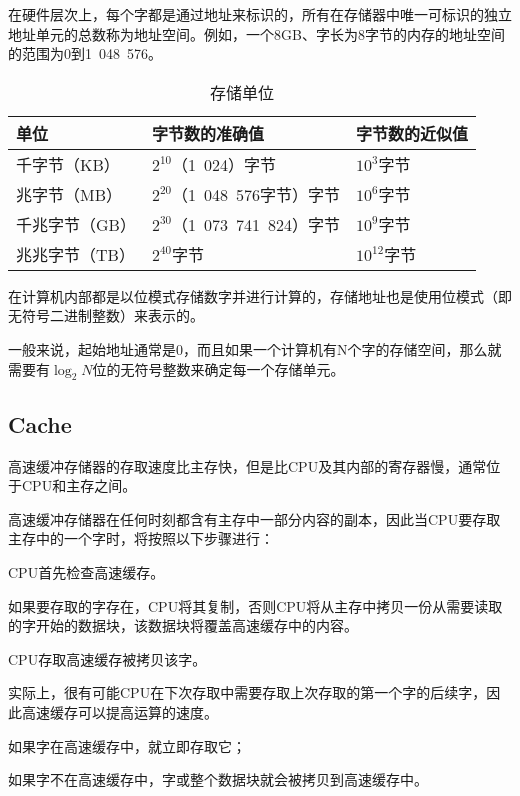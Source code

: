 在硬件层次上，每个字都是通过地址来标识的，所有在存储器中唯一可标识的独立地址单元的总数称为地址空间。例如，一个8GB、字长为8字节的内存的地址空间的范围为0到1~048~576。

\begin{table}[htbp]
\centering
\caption{存储单位}
\begin{tabular}{lll}
\hline
单位 & 字节数的准确值 & 字节数的近似值\\
\hline
千字节（KB） & $2^{10}$（1~024）字节 & $10^3$字节\\
兆字节（MB） & $2^{20}$（1~048~576字节）字节 & $10^6$字节\\
千兆字节（GB） & $2^{30}$（1~073~741~824）字节 & $10^9$字节\\
兆兆字节（TB）& $2^{40}$字节 & $10^{12}$字节\\
\hline
\end{tabular}
\end{table}



在计算机内部都是以位模式存储数字并进行计算的，存储地址也是使用位模式（即无符号二进制整数）来表示的。

一般来说，起始地址通常是0，而且如果一个计算机有N个字的存储空间，那么就需要有$\log_2N$位的无符号整数来确定每一个存储单元。




\subsection{Cache}



高速缓冲存储器的存取速度比主存快，但是比CPU及其内部的寄存器慢，通常位于CPU和主存之间。

高速缓冲存储器在任何时刻都含有主存中一部分内容的副本，因此当CPU要存取主存中的一个字时，将按照以下步骤进行：

\begin{compactenum}
\item CPU首先检查高速缓存。
\item 如果要存取的字存在，CPU将其复制，否则CPU将从主存中拷贝一份从需要读取的字开始的数据块，该数据块将覆盖高速缓存中的内容。
\item CPU存取高速缓存被拷贝该字。
\end{compactenum}



实际上，很有可能CPU在下次存取中需要存取上次存取的第一个字的后续字，因此高速缓存可以提高运算的速度。

\begin{compactitem}
\item 如果字在高速缓存中，就立即存取它；
\item 如果字不在高速缓存中，字或整个数据块就会被拷贝到高速缓存中。
\end{compactitem}


